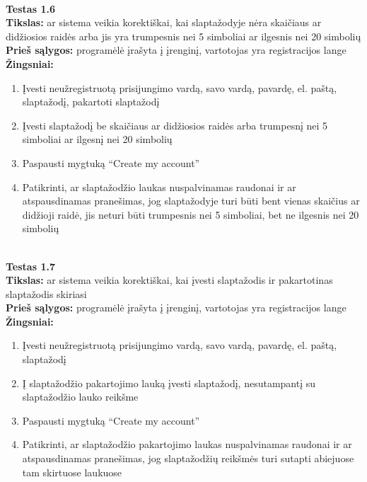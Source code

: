 \documentclass{VUMIFPSkursinis}
\begin{document}
		\textbf{}\\
		\textbf{Testas 1.6}\\
		\textbf{Tikslas:} ar sistema veikia korektiškai, kai slaptažodyje nėra skaičiaus ar didžiosios raidės arba jis yra trumpesnis nei 5 simboliai ar ilgesnis nei 20 simbolių\\
		\textbf{Prieš sąlygos:} programėlė įrašyta į įrenginį, vartotojas yra registracijos lange\\
		\textbf{Žingsniai:}
		\begin{enumerate}[noitemsep,topsep=0pt]
			\item Įvesti neužregistruotą prisijungimo vardą, savo vardą, pavardę, el. paštą, slaptažodį, pakartoti slaptažodį
			\item Įvesti slaptažodį be skaičiaus ar didžiosios raidės arba trumpesnį nei 5 simboliai ar ilgesnį nei 20 simbolių
			\item Paspausti mygtuką “Create my account” 
			\item Patikrinti, ar slaptažodžio laukas nuspalvinamas raudonai ir ar atspausdinamas pranešimas, jog slaptažodyje turi būti bent vienas skaičius ar didžioji raidė, jis neturi būti trumpesnis nei 5 simboliai, bet ne ilgesnis nei 20 simbolių
		\end{enumerate}	
		\textbf{}\\
		\textbf{Testas 1.7}\\
		\textbf{Tikslas:} ar sistema veikia korektiškai, kai įvesti slaptažodis ir pakartotinas slaptažodis skiriasi\\
		\textbf{Prieš sąlygos:} programėlė įrašyta į įrenginį, vartotojas yra registracijos lange\\
		\textbf{Žingsniai:}
		\begin{enumerate}[noitemsep,topsep=0pt]
			\item Įvesti neužregistruotą prisijungimo vardą, savo vardą, pavardę, el. paštą, slaptažodį
			\item Į slaptažodžio pakartojimo lauką įvesti slaptažodį, nesutampantį su slaptažodžio lauko reikšme
			\item Paspausti mygtuką “Create my account” 
			\item Patikrinti, ar slaptažodžio pakartojimo laukas nuspalvinamas raudonai ir ar atspausdinamas pranešimas, jog slaptažodžių reikšmės turi sutapti abiejuose tam skirtuose laukuose
		\end{enumerate}		
\end{document}
